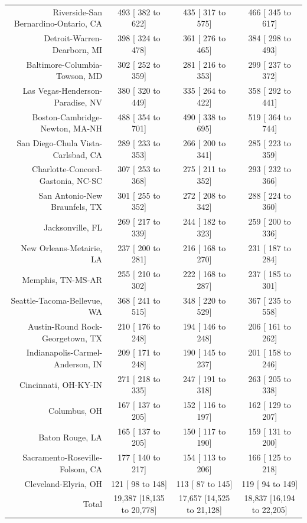 \documentclass{article}
\begin{document}
\begin{table}[H]
\begin{tabular}{|r|c|c|c|}
		Riverside-San Bernardino-Ontario, CA &    493 [   382 to    622] &    435 [   317 to    575] &    466 [   345 to    617]\\
		Detroit-Warren-Dearborn, MI &    398 [   324 to    478] &    361 [   276 to    465] &    384 [   298 to    493]\\
		Baltimore-Columbia-Towson, MD &    302 [   252 to    359] &    281 [   216 to    353] &    299 [   237 to    372]\\
		Las Vegas-Henderson-Paradise, NV &    380 [   320 to    449] &    335 [   264 to    422] &    358 [   292 to    441]\\
		Boston-Cambridge-Newton, MA-NH &    488 [   354 to    701] &    490 [   338 to    695] &    519 [   364 to    744]\\
		San Diego-Chula Vista-Carlsbad, CA &    289 [   233 to    353] &    266 [   200 to    341] &    285 [   223 to    359]\\
		Charlotte-Concord-Gastonia, NC-SC &    307 [   253 to    368] &    275 [   211 to    352] &    293 [   232 to    366]\\
		San Antonio-New Braunfels, TX &    301 [   255 to    352] &    272 [   208 to    342] &    288 [   224 to    360]\\
		Jacksonville, FL &    269 [   217 to    339] &    244 [   182 to    323] &    259 [   200 to    336]\\
		New Orleans-Metairie, LA &    237 [   200 to    281] &    216 [   168 to    270] &    231 [   187 to    284]\\
		Memphis, TN-MS-AR &    255 [   210 to    302] &    222 [   168 to    287] &    237 [   185 to    301]\\
		Seattle-Tacoma-Bellevue, WA &    368 [   241 to    515] &    348 [   220 to    529] &    367 [   235 to    558]\\
		Austin-Round Rock-Georgetown, TX &    210 [   176 to    248] &    194 [   146 to    248] &    206 [   161 to    262]\\
		Indianapolis-Carmel-Anderson, IN &    209 [   171 to    248] &    190 [   145 to    237] &    201 [   158 to    246]\\
		Cincinnati, OH-KY-IN &    271 [   218 to    335] &    247 [   191 to    318] &    263 [   205 to    338]\\
		Columbus, OH &    167 [   137 to    205] &    152 [   116 to    197] &    162 [   129 to    207]\\
		Baton Rouge, LA &    165 [   137 to    205] &    150 [   117 to    190] &    159 [   131 to    200]\\
		Sacramento-Roseville-Folsom, CA &    177 [   140 to    217] &    154 [   113 to    206] &    166 [   125 to    218]\\
		Cleveland-Elyria, OH &    121 [    98 to    148] &    113 [    87 to    145] &    119 [    94 to    149]\\
		\hline
		Total & 19,387 [18,135 to 20,778] & 17,657 [14,525 to 21,128] & 18,837 [16,194 to 22,205]\\
		\hline
	\end{tabular}
\end{table}
\end{document}

